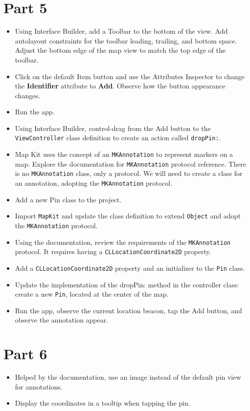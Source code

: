 \documentclass[a4paper,11pt]{scrartcl}
\begin{document}
\section*{Part 5}

\begin{itemize}
\item Using Interface Builder, add a Toolbar to the bottom of the view. Add autolayout constraints for the toolbar leading, trailing, and bottom space. Adjust the bottom edge of the map view to match the top edge of the toolbar.
\item Click on the default Item button and use the Attributes Inspector to change the \textbf{Identifier} attribute to \textbf{Add}. Observe how the button appearance changes.
\item Run the app.
\item Using Interface Builder, control-drag from the Add button to the \texttt{ViewController} class definition to create an action called \texttt{dropPin:}.
\item Map Kit uses the concept of an \texttt{MKAnnotation} to represent markers on a map. Explore the documentation for \texttt{MKAnnotation} protocol reference. There is no \texttt{MKAnnotation} class, only a protocol. We will need to create a class for an annotation, adopting the \texttt{MKAnnotation} protocol.
\item Add a new Pin class to the project.
\item Import \texttt{MapKit} and update the class definition to extend \texttt{Object} and adopt the \texttt{MKAnnotation} protocol.
\item Using the documentation, review the requirements of the \texttt{MKAnnotation} protocol. It requires having a \texttt{CLLocationCoordinate2D} property.
\item Add a \texttt{CLLocationCoordinate2D} property and an initializer to the \texttt{Pin} class.
\item Update the implementation of the dropPin: method in the controller class: create a new \texttt{Pin}, located at the center of the map.
\item Run the app, observe the current location beacon, tap the Add button, and observe the annotation appear.
\end{itemize}

\section*{Part 6}

\begin{itemize}
\item Helped by the documentation, use an image instead of the default pin view for annotations.
\item Display the coordinates in a tooltip when tapping the pin.
\end{itemize}
\end{document}
